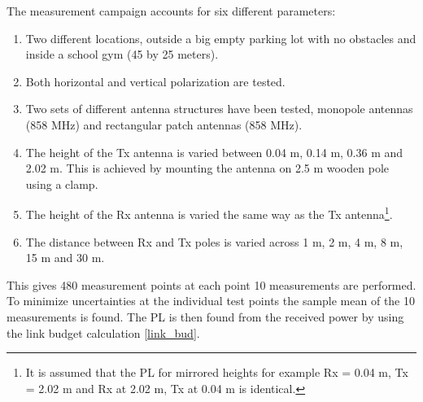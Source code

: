 The measurement campaign accounts for six different parameters: 
\begin{enumerate}
\item Two different locations, outside a big empty parking lot with no obstacles and inside a school gym (45 by 25 meters). 
\item Both horizontal and vertical polarization are tested. 
\item Two sets of different antenna structures have been tested, monopole antennas (858 MHz) and rectangular patch antennas (858 MHz). 
\item The height of the Tx antenna is varied between 0.04 m, 0.14 m, 0.36 m and 2.02 m. This is achieved by mounting the antenna on 2.5 m wooden pole using a clamp.
\item The height of the Rx antenna is varied the same way as the Tx antenna\footnote{It is assumed that the PL for mirrored heights for example Rx = 0.04 m, Tx = 2.02 m and Rx at 2.02 m, Tx at 0.04 m is identical.}.
\item The distance between Rx and Tx poles is varied across 1 m, 2 m, 4 m, 8 m, 15 m and 30 m.
\end{enumerate}
This gives 480 measurement points at each point 10 measurements are performed. To minimize uncertainties at the individual test points the sample mean of the 10 measurements is found. The PL is then found from the received power by using the link budget calculation \eqref{link_bud}. %











